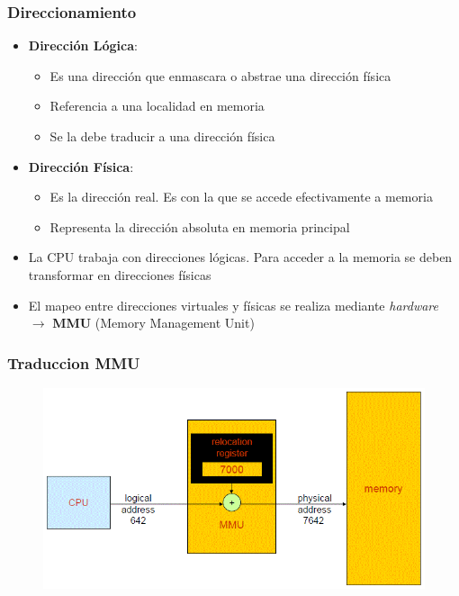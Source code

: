 \begin{frame}
  \frametitle{Direccionamiento}
  \begin{itemize}
	  \item \textbf{Dirección Lógica}:
	  \begin{itemize}
	  	\item Es una dirección que enmascara o abstrae una dirección física
	  	\item Referencia a una localidad en memoria
	  	\item Se la debe traducir a una dirección física
	  \end{itemize}
	  \item \textbf{Dirección Física}:
	  \begin{itemize}
	  	\item Es la dirección real. Es con la que se accede efectivamente a memoria
	  	\item Representa la dirección absoluta en memoria principal
	  \end{itemize}
	  \item La CPU trabaja con direcciones lógicas. Para acceder a la memoria se deben transformar en direcciones físicas
	  \item El mapeo entre direcciones virtuales y físicas se realiza mediante \emph{hardware} $\rightarrow$ \textbf{MMU} (Memory Management Unit)
  \end{itemize}
\end{frame}

\begin{frame}
  \frametitle{Traduccion \textbf{MMU}}
  \begin{figure}
    \includegraphics[scale=0.4]{images/mmu.png}
  \end{figure}
\end{frame}

